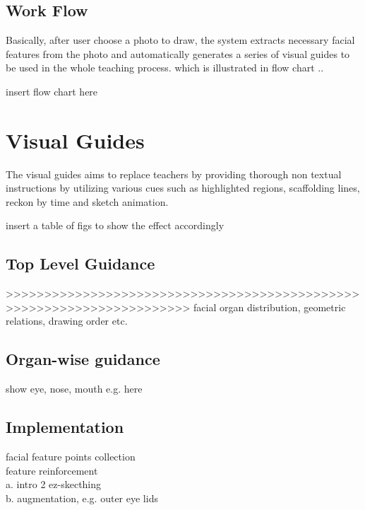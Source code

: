 		\subsection{Work Flow}
			Basically, after user choose a photo to draw, the system extracts necessary facial features from the photo and automatically generates a series of visual guides to be used in the whole teaching process. which is illustrated in flow chart .. \\
			\begin{center}
			insert flow chart here
			\end{center}

\section{Visual Guides} \label{sec-vg}
		The visual guides aims to replace teachers by providing thorough non textual instructions by utilizing various cues such as highlighted regions, scaffolding lines, reckon by time and sketch animation.
						\begin{center}
							insert a table of figs to show the effect accordingly
						\end{center}
						
		\subsection{Top Level Guidance}
		>>>>>>>>>>>>>>>>>>>>>>>>>>>>>>>>>>>>>>>>>>>>>>>>>>>>>>>>>>>>>>>>>>>>>>
				facial organ distribution, geometric relations, drawing order etc.
						
		\subsection{Organ-wise guidance}
				show eye, nose, mouth e.g. here 
				
		\subsection{Implementation}
			
				facial feature points collection \\
					
				feature reinforcement \\
					
						a. intro 2 ez-skecthing \\
					
						b. augmentation, e.g. outer eye lids \\
					
